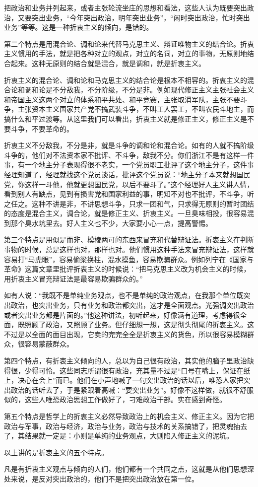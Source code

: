 把政治和业务并列起来，或者主张轮流坐庄的思想和看法，这些人认为既要突出政治，又要突出业务，“今年突出政治，明年突出业务”，“闲时突出政治，忙时突出业务”等等。这是一种折衷主义的倾向，是错的。

第二个特点是用混合论、调和论来代替马克思主义、辩证唯物主义的结合论。折衷主义惯用的手法，就是把各种对立的观点，对立的名词，对立的事物，无原则地结合起来。这种无原则的结合就是混合，就是调和，就是折衷主义。

折衷主义的混合论、调和论和马克思主义的结合论是根本不相容的。折衷主义的混合论和调和论是不分敌我，不分阶级，不分是非。例如现代修正主义主张社会主义和帝国主义这两个对立的体系和平共处、和平竞赛，主张取消军队，主张不要斗争，主张资本主义国家共产党不搞武装斗争，不叫工人罢工，不叫农民斗地主，而搞什么和平过渡等。从这里我们可以看出，折衷主义就是修正主义，修正主义是不要斗争，不要革命的。

折衷主义不分敌我，不分是非，就是斗争的调和论和混合论。如有的人就不搞阶级斗争的，他们对不法资本家不批评、不斗争，敌我不分。你们浙江不是有这样一件事，有一个地主分子表现得很不老实，一个党员职工批评了这个地主分子，这件事经理知道了，经理就找这个党员谈话，批评这个党员说：“地主分子本来就想国民党，你这样一斗他，他就更想国民党，以后不要斗了。”这个经理好人主义讲人情，看到别人有缺点，见到有损害党和国家利益的事，明知不对也不批评，不斗争，听之任之。这种不讲是非，不讲思想斗争，只求一团和气，只求得无原则的暂时团结的态度是混合主义，调合论，就是修正主义、折衷主义。一旦臭味相投，很容易混到那个臭水坑里去。好人主义也不少，大家要小心一点，提高警惕。

第三个特点是用似是而非、模棱两可的东西来冒充和代替辩证法。折衷主义在判断事物的时候，总是这样也对，那样也对。他们惯用这种手法来冒充辩证法，这样就容易打“马虎眼”，容易偷梁换柱，混水摸鱼，容易欺骗群众。例如列宁在《国家与革命》这篇文章里批评折衷主义的时候说：“把马克思主义改为机会主义的时候，用折衷主义冒充辩证法是最容易欺骗群众的。”

如有人说：“我既不是单纯业务观点，也不是单纯的政治观点，在我那个单位既突出政治，也突出业务，只有业务和政治都突出，这才是全面观点。光强调突出政治或者突出业务都是片面的。”他这种讲法，初听起来，好像满有道理，考虑得很全面，既照顾了政治，又照顾了业务。但仔细想一想，这是彻头彻尾的折衷主义。这不过是以全面的面目出现，它卖的完完全全是折衷主义的货色，所以很容易模糊群众，很容易蒙蔽群众。

第四个特点，有折衷主义倾向的人，总以为自己很有政治，其实他的脑子里政治缺得很，少得可怜。这些同志所谓很有政治，充其量不过是“口号在嘴上，保证在纸上，决心在会上”而已。他们在小声地喊了一句突出政治的话以后，唯恐人家把突出政治的话听去了，于是紧跟着高喊：“要突出业务”。好像不这样做，就很不舒服似的，这些人唯恐政治思想工作做好了，刁难政治干部。实在感到奇怪。

第五个特点是哲学上的折衷主义必然导致政治上的机会主义、修正主义。因为它把政治与军事，政治与经济，政治与业务，政治与技术的关系搞错了，把灵魂抽去了，其结果就一定是：小则是单纯的业务观点，大则陷入修正主义的泥坑。

以上讲的是折衷主义的五个特点。

凡是有折衷主义观点与倾向的人们，他们都有一个共同之点，这就是从他们思想深处来说，是反对突出政治的，他们不是把突出政治放在第一位。


